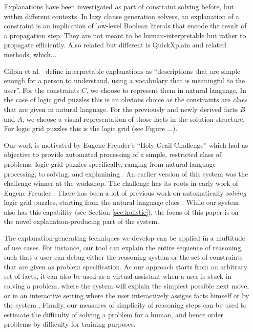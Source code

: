 Explanations have been investigated as part of constraint solving before, but within different contexts. In lazy clause generation solvers, an explanation of a constraint is an implication of low-level Boolean literals that encode the result of a propagation step. They are not meant to be human-interpretable but rather to propagate efficiently. Also related but different is QuickXplain and related methods, which...

Gilpin et al.~\cite{DBLP:conf/dsaa/GilpinBYBSK18} define interpretable explanations as ``descriptions that are simple enough for a person to understand, using a vocabulary that is meaningful to the user''. For the constraints $C$, we choose to represent them in natural language. In the case of logic grid puzzles this is an obvious choice as the constraints are \textit{clues} that are given in natural language. For the previously and newly derived facts $B$ and $A$, we choose a visual representation of those facts in the solution structure. For logic grid puzzles this is the logic grid (see Figure ...).

Our work is motivated by Eugene Freuder's ``Holy Grail Challenge'' which had as objective  to provide automated processing of a simple, restricted class of problems, logic grid puzzles specifically, ranging from natural language processing, to solving, and explanining \cite{}. 
An earlier version of this system was the challenge winner at the workshop. The challenge has its roots in early work of Eugene Freuder \cite{DBLP:conf/aaai/SabinF96,DBLP:conf/aaai/SqalliF96}.
There has been a lot of previous work on automatically \emph{solving} logic grid puzzles, starting from the natural language clues \cite{related,work}. 
While our system also has this capability (see Section \ref{sec:holistic}), the focus of this paper is on the novel explanation-producing part of the system.

The explanation-generating techniques we develop can be applied in a multitude of use cases. 
For instance, our tool can explain the entire sequence of reasoning, such that a user can debug either the reasoning system or the set of constraints that are given as problem specification. 
As our approach starts from an arbitrary set of facts, it can also be used as a virtual assistant when a user is stuck in solving a problem, where the system will explain the simplest possible next move, or in an interactive setting where the user interactively assigns facts himself or by the system . 
Finally, our measures of simplicity of reasoning steps can be used to estimate the difficulty of solving a problem for a human, and hence order problems by difficulty for training purposes.

